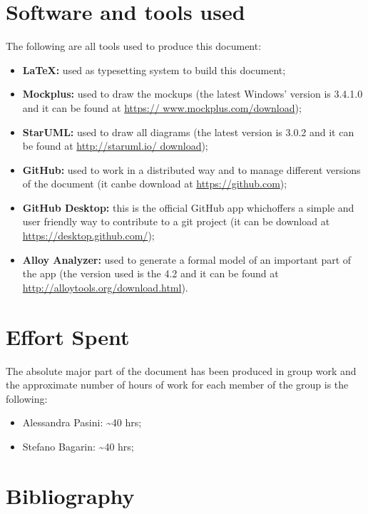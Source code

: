 \section{Software and tools used}
The following are all tools used to produce this document:
\begin{itemize}
	\item \textbf{\LaTeX:} used as typesetting system to build this document;
	\item \textbf{Mockplus:} used to draw the mockups (the latest Windows' version is 3.4.1.0 and it can be found at \url{https://			www.mockplus.com/download});
	\item \textbf{StarUML:} used to draw all diagrams (the latest version is 3.0.2 and it can be found at \url{http://staruml.io/			download});
	\item \textbf{GitHub:} used to work in a distributed way and to manage different versions of the document (it canbe download at		\url{https://github.com});
	\item \textbf{GitHub Desktop:} this is the official GitHub app whichoffers a simple and user friendly way to contribute to a git 			project (it can be download at \url{https://desktop.github.com/});
	\item \textbf{Alloy Analyzer:} used to generate a formal model of an important part of the app (the version used is the 4.2 and it 		can be found at \url{http://alloytools.org/download.html}).
\end{itemize}

\section{Effort Spent}
The absolute major part of the document has been produced in group work and the approximate number of hours of work for each member of the group is the following:
\begin{itemize}
\item Alessandra Pasini: \textasciitilde 40 hrs;
\item Stefano Bagarin: \textasciitilde 40 hrs;
\end{itemize}

\section{Bibliography}
